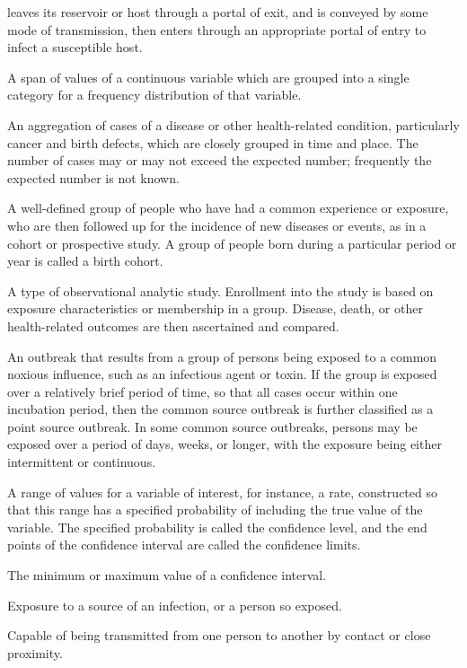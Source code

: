\documentclass[11pt]{article}
\begin{document}
\begin{description}
leaves its reservoir or host through a portal of exit, and is
conveyed by some mode of transmission, then enters through an
appropriate portal of entry to infect a susceptible host.
\item[Class interval] A span of values of a continuous variable
which are grouped into a single category for a frequency
distribution of that variable.
\item[Cluster] An aggregation of cases of a disease or other
health-related condition, particularly cancer and birth defects,
which are closely grouped in time and place. The number of cases
may or may not exceed the expected number; frequently the
expected number is not known.
\item[Cohort] A well-defined group of people who have had a
common experience or exposure, who are then followed up for the
incidence of new diseases or events, as in a cohort or
prospective study. A group of people born during a particular
period or year is called a birth cohort.
\item[Cohort study] A type of observational analytic study.
Enrollment into the study is based on exposure characteristics
or membership in a group. Disease, death, or other
health-related outcomes are then ascertained and compared.
\item[Common source outbreak] An outbreak that results from a
group of persons being exposed to a common noxious influence,
such as an infectious agent or toxin. If the group is exposed
over a relatively brief period of time, so that all cases occur
within one incubation period, then the common source outbreak is
further classified as a point source outbreak. In some common
source outbreaks, persons may be exposed over a period of days,
weeks, or longer, with the exposure being either intermittent or
continuous.
\item[Confidence interval] A range of values for a variable of
interest, for instance, a rate, constructed so that this range
has a specified probability of including the true value of the
variable. The specified probability is called the confidence
level, and the end points of the confidence interval are called
the confidence limits.
\item[Confidence limit] The minimum or maximum value of a
confidence interval.
\item[Contact] Exposure to a source of an infection, or a person
so exposed.
\item[Contagious] Capable of being transmitted from one person to
another by contact or close proximity.

\end{description}
\end{document}
